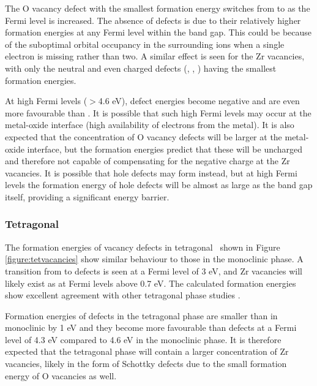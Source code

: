 The O vacancy defect with the smallest formation energy switches from  to  as the Fermi level is increased. The absence of  defects is due to their relatively higher formation energies at any Fermi level within the band gap. This could be because of the suboptimal orbital occupancy in the surrounding ions when a single electron is missing rather than two. A similar effect is seen for the Zr vacancies, with only the neutral and even charged defects (, , ) having the smallest formation energies.

At high Fermi levels ($>$4.6 eV),  defect energies become negative and are even more favourable than . It is possible that such high Fermi levels may occur at the metal-oxide interface (high availability of electrons from the metal). It is also expected that the concentration of O vacancy defects will be larger at the metal-oxide interface, but the formation energies predict that these will be uncharged and therefore not capable of compensating for the negative charge at the Zr vacancies. It is possible that hole defects may form instead, but at high Fermi levels the formation energy of hole defects will be almost as large as the band gap itself, providing a significant energy barrier.

\subsubsection{Tetragonal}

The formation energies of vacancy defects in tetragonal \zirconia\ shown in Figure \ref{figure:tetvacancies} show similar behaviour to those in the monoclinic phase. A transition from  to  defects is seen at a Fermi level of 3 eV, and Zr vacancies will likely exist as  at Fermi levels above 0.7 eV. The calculated formation energies show excellent agreement with other tetragonal phase studies \cite{youssef2012intrinsic}.

Formation energies of  defects in the tetragonal phase are smaller than in monoclinic by 1 eV and they become more favourable than  defects at a Fermi level of 4.3 eV compared to 4.6 eV in the monoclinic phase. It is therefore expected that the tetragonal phase will contain a larger concentration of Zr vacancies, likely in the form of Schottky defects due to the small formation energy of O vacancies as well. 

